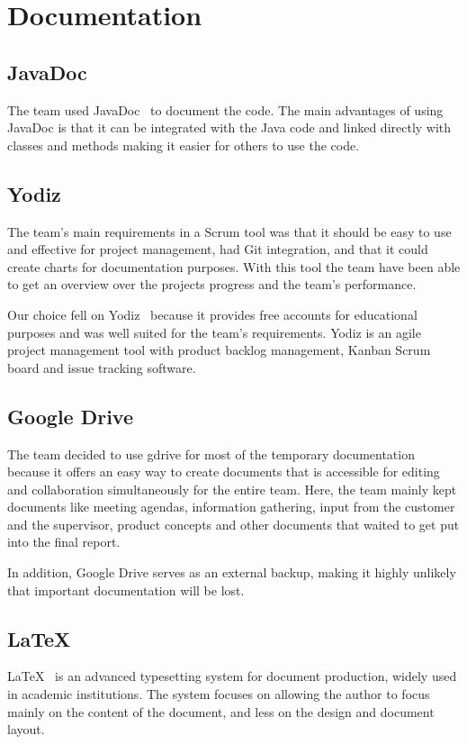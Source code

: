 \section{Documentation}

\subsection{JavaDoc}
The team used JavaDoc~\cite{javadoc} to document the code. The main advantages of using JavaDoc is that it can be integrated with the Java code and linked directly with classes and methods making it easier for others to use the code.

\subsection{Yodiz}
The team's main requirements in a Scrum tool was that it should be easy to use and effective for project management, had Git integration, and that it could create charts for documentation purposes. With this tool the team have been able to get an overview over the projects progress and the team's performance. 

Our choice fell on Yodiz~\cite{yodiz} because it provides free accounts for educational purposes and was well suited for the team's requirements. Yodiz is an agile project management tool with product backlog management, Kanban Scrum board and issue tracking software.

\subsection{Google Drive}
The team decided to use \gls{gdrive} for most of the temporary documentation because it offers an easy way to create documents that is accessible for editing and collaboration simultaneously for the entire team. Here, the team mainly kept documents like meeting agendas, information gathering, input from the customer and the supervisor, product concepts and other documents that waited to get put into the final report. 

In addition, Google Drive serves as an external backup, making it highly unlikely that important documentation will be lost. 


\subsection{\LaTeX}
LaTeX~\cite{latex} is an advanced typesetting system for document production, widely used in
academic institutions. The system focuses on allowing the author to focus mainly on the content of the document, and less on the design and document layout.

